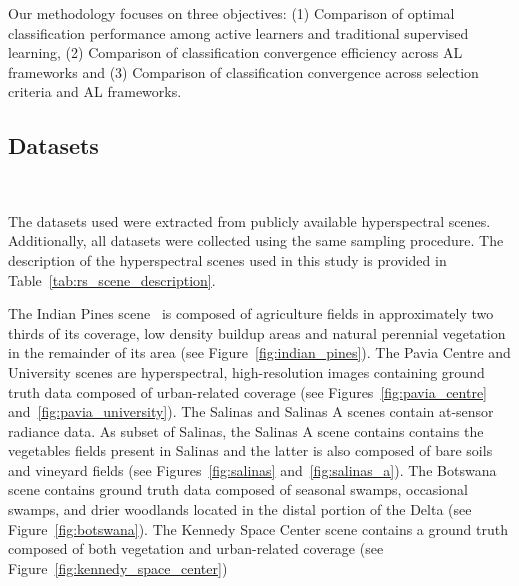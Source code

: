 \documentclass[parskip=full]{scrartcl}
\begin{document}
Our methodology focuses on three objectives: (1) Comparison of optimal
classification performance among active learners and traditional supervised
learning, (2) Comparison of classification convergence efficiency across AL
frameworks and (3) Comparison of classification convergence across selection
criteria and AL frameworks.

\subsection{Datasets}~\label{sec:datasets}

The datasets used were extracted from publicly available hyperspectral scenes.
Additionally, all datasets were collected using the same sampling procedure. The
description of the hyperspectral scenes used in this study is provided in
Table~\ref{tab:rs_scene_description}.


The Indian Pines scene~\cite{Baumgardner2015} is composed of agriculture fields
in approximately two thirds of its coverage, low density buildup areas and
natural perennial vegetation in the remainder of its area (see
Figure~\ref{fig:indian_pines}). The Pavia Centre and University scenes are
hyperspectral, high-resolution images containing ground truth data composed of
urban-related coverage (see Figures~\ref{fig:pavia_centre}
and~\ref{fig:pavia_university}). The Salinas and Salinas A scenes contain
at-sensor radiance data. As subset of Salinas, the Salinas A scene contains
contains the vegetables fields present in Salinas and the latter is also
composed of bare soils and vineyard fields (see Figures~\ref{fig:salinas}
and~\ref{fig:salinas_a}). The Botswana scene contains ground truth data composed
of seasonal swamps, occasional swamps, and drier woodlands located in the distal
portion of the Delta (see Figure~\ref{fig:botswana}). The Kennedy Space Center
scene contains a ground truth composed of both vegetation and urban-related
coverage (see Figure~\ref{fig:kennedy_space_center})
\end{document}
